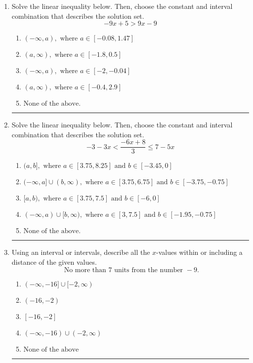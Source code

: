 \documentclass[14pt]{extbook}
\newcommand{\litem}[1]{\item#1\hspace*{-1cm}\rule{\textwidth}{0.4pt}}
\begin{document}
\begin{enumerate}
{\begin{enumerate}[label=\Alph*.]
\end{enumerate} }
\litem{
Solve the linear inequality below. Then, choose the constant and interval combination that describes the solution set.\[ -9x + 5 > 9x -9 \]\begin{enumerate}[label=\Alph*.]
\item \( (-\infty, a), \text{ where } a \in [-0.08, 1.47] \)
\item \( (a, \infty), \text{ where } a \in [-1.8, 0.5] \)
\item \( (-\infty, a), \text{ where } a \in [-2, -0.04] \)
\item \( (a, \infty), \text{ where } a \in [-0.4, 2.9] \)
\item \( \text{None of the above}. \)

\end{enumerate} }
\litem{
Solve the linear inequality below. Then, choose the constant and interval combination that describes the solution set.\[ -3 - 3 x < \frac{-6 x + 8}{3} \leq 7 - 5 x \]\begin{enumerate}[label=\Alph*.]
\item \( (a, b], \text{ where } a \in [3.75, 8.25] \text{ and } b \in [-3.45, 0] \)
\item \( (-\infty, a] \cup (b, \infty), \text{ where } a \in [3.75, 6.75] \text{ and } b \in [-3.75, -0.75] \)
\item \( [a, b), \text{ where } a \in [3.75, 7.5] \text{ and } b \in [-6, 0] \)
\item \( (-\infty, a) \cup [b, \infty), \text{ where } a \in [3, 7.5] \text{ and } b \in [-1.95, -0.75] \)
\item \( \text{None of the above.} \)

\end{enumerate} }
\litem{
Using an interval or intervals, describe all the $x$-values within or including a distance of the given values.\[ \text{ No more than } 7 \text{ units from the number } -9. \]\begin{enumerate}[label=\Alph*.]
\item \( (-\infty, -16] \cup [-2, \infty) \)
\item \( (-16, -2) \)
\item \( [-16, -2] \)
\item \( (-\infty, -16) \cup (-2, \infty) \)
\item \( \text{None of the above} \)


\end{enumerate}}
\end{enumerate}
\end{document}
